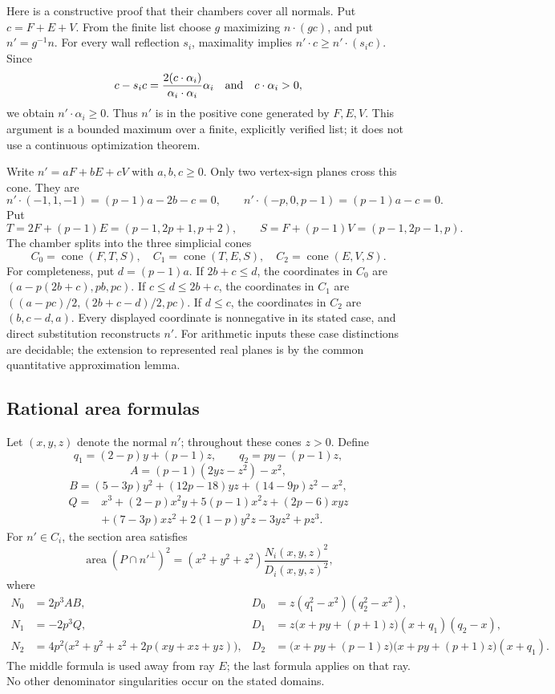 Here is a constructive proof that their chambers cover all normals.  Put
$c=F+E+V$.  From the finite list choose $g$ maximizing $n\cdot(gc)$, and put
$n'=g^{-1}n$.  For every wall reflection $s_i$, maximality implies
$n'\cdot c\ge n'\cdot(s_i c)$.  Since
\[
 c-s_i c=\frac{2(c\cdot\alpha_i)}{\alpha_i\cdot\alpha_i}\alpha_i
 \quad\hbox{and}\quad c\cdot\alpha_i>0,
\]
we obtain $n'\cdot\alpha_i\ge0$.  Thus $n'$ is in the positive cone generated
by $F,E,V$.  This argument is a bounded maximum over a finite, explicitly
verified list; it does not use a continuous optimization theorem.

Write $n'=aF+bE+cV$ with $a,b,c\ge0$.  Only two vertex-sign planes cross
this cone.  They are
\[
 n'\cdot(-1,1,-1)=(p-1)a-2b-c=0,
 \qquad
 n'\cdot(-p,0,p-1)=(p-1)a-c=0.
\]
Put
\[
 T=2F+(p-1)E=(p-1,2p+1,p+2),\qquad
 S=F+(p-1)V=(p-1,2p-1,p).
\]
The chamber splits into the three simplicial cones
\[
 C_0=\operatorname{cone}(F,T,S),\quad
 C_1=\operatorname{cone}(T,E,S),\quad
 C_2=\operatorname{cone}(E,V,S).
\]
For completeness, put $d=(p-1)a$.  If $2b+c\le d$, the coordinates in
$C_0$ are $(a-p(2b+c),pb,pc)$.  If $c\le d\le2b+c$, the coordinates in
$C_1$ are $((a-pc)/2,(2b+c-d)/2,pc)$.  If $d\le c$, the coordinates in
$C_2$ are $(b,c-d,a)$.  Every displayed coordinate is nonnegative in its
stated case, and direct substitution reconstructs $n'$.  For arithmetic
inputs these case distinctions are decidable; the extension to represented
real planes is by the common quantitative approximation lemma.

\subsection{Rational area formulas}
Let $(x,y,z)$ denote the normal $n'$; throughout these cones $z>0$.
Define
\[
 q_1=(2-p)y+(p-1)z,\qquad q_2=py-(p-1)z,
\]
\[
 A=(p-1)(2yz-z^2)-x^2,
\]
\[
 B=(5-3p)y^2+(12p-18)yz+(14-9p)z^2-x^2,
\]
\begin{align*}
 Q={}&x^3+(2-p)x^2y+5(p-1)x^2z+(2p-6)xyz\\
    &+(7-3p)xz^2+2(1-p)y^2z-3yz^2+pz^3.
\end{align*}
For $n'\in C_i$, the section area satisfies
\[
 \operatorname{area}(P\cap n'^\perp)^2
       =(x^2+y^2+z^2)\frac{N_i(x,y,z)^2}{D_i(x,y,z)^2},
\]
where
\begin{align*}
 N_0&=2p^3AB,&
 D_0&=z(q_1^2-x^2)(q_2^2-x^2),\\
 N_1&=-2p^3Q,&
 D_1&=z\bigl(x+py+(p+1)z\bigr)(x+q_1)(q_2-x),\\
 N_2&=4p^2\bigl(x^2+y^2+z^2+2p(xy+xz+yz)\bigr),&
 D_2&=\bigl(x+py+(p-1)z\bigr)\bigl(x+py+(p+1)z\bigr)(x+q_1).
\end{align*}
The middle formula is used away from ray $E$; the last formula applies on
that ray.  No other denominator singularities occur on the stated domains.

